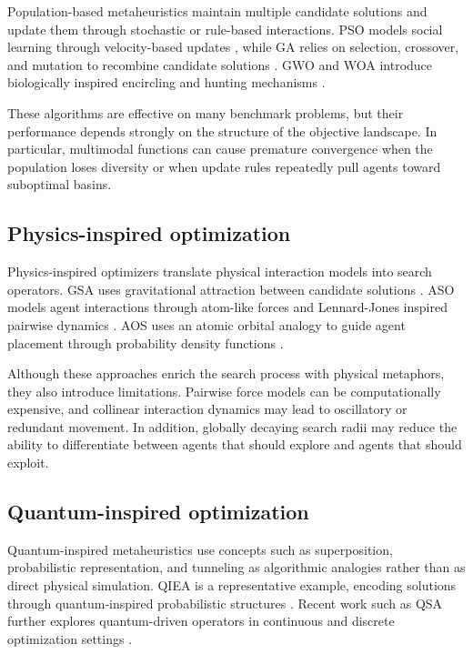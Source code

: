\documentclass[final,5p,times,twocolumn]{elsarticle}
\begin{document}
Population-based metaheuristics maintain multiple candidate
solutions and update them through stochastic or rule-based
interactions. PSO models social learning through velocity-based
updates \cite{kennedy1995pso}, while GA relies on selection,
crossover, and mutation to recombine candidate solutions
\cite{goldberg1989ga}. GWO and WOA introduce biologically
inspired encircling and hunting mechanisms
\cite{mirjalili2014gwo,mirjalili2016woa}.

These algorithms are effective on many benchmark problems, but
their performance depends strongly on the structure of the
objective landscape. In particular, multimodal functions can
cause premature convergence when the population loses diversity
or when update rules repeatedly pull agents toward suboptimal
basins.

\subsection{Physics-inspired optimization}

Physics-inspired optimizers translate physical interaction
models into search operators. GSA uses gravitational attraction
between candidate solutions \cite{rashedi2009gsa}. ASO models
agent interactions through atom-like forces and Lennard-Jones
inspired pairwise dynamics \cite{zhao2019aso}. AOS uses an
atomic orbital analogy to guide agent placement through
probability density functions \cite{azizi2021aos}.

Although these approaches enrich the search process with
physical metaphors, they also introduce limitations. Pairwise
force models can be computationally expensive, and collinear
interaction dynamics may lead to oscillatory or redundant
movement. In addition, globally decaying search radii may reduce
the ability to differentiate between agents that should explore
and agents that should exploit.

\subsection{Quantum-inspired optimization}

Quantum-inspired metaheuristics use concepts such as
superposition, probabilistic representation, and tunneling as
algorithmic analogies rather than as direct physical simulation.
QIEA is a representative example, encoding solutions through
quantum-inspired probabilistic structures \cite{nowotniak2010qiea}.
Recent work such as QSA further explores quantum-driven
operators in continuous and discrete optimization settings
\cite{qsa2025}.
\end{document}
